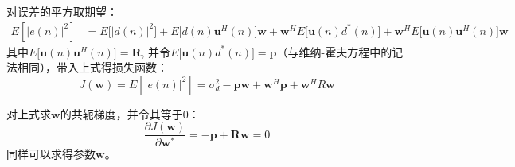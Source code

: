 \documentclass[UTF8]{ctexart} %
\begin{document}
			对误差的平方取期望：
			\[\begin{aligned}
			E[|e(n)|^2] & =  E\big[|d(n)|^2\big] + E\big[d(n)\textbf{u}^H(n)\big]\textbf{w} + \textbf{w}^HE\big[\textbf{u}(n)d^*(n)\big] + \textbf{w}^HE\big[\textbf{u}(n)\textbf{u}^H(n)\big]\textbf{w}
			\end{aligned}
			\]
			其中$E\big[\textbf{u}(n)\textbf{u}^H(n)\big] = \textbf{R}$, 并令$E\big[\textbf{u}(n)d^*(n)\big] =\textbf{p} $（与维纳-霍夫方程中的记法相同），带入上式得损失函数：
			\[J(\textbf{w}) = E[|e(n)|^2]  = \sigma_d^2 - \textbf{p}\textbf{w} + \textbf{w}^H\textbf{p} +\textbf{w}^HR\textbf{w}\]
			
			对上式求$\textbf{w}$的共轭梯度，并令其等于0：
			\[\frac{\partial J(\textbf{w})}{\partial\textbf{w}^*} = -\textbf{p} + \textbf{R} \textbf{w}=0\]
			同样可以求得参数$\textbf{w}$。
		
		
		
		
\end{document}
